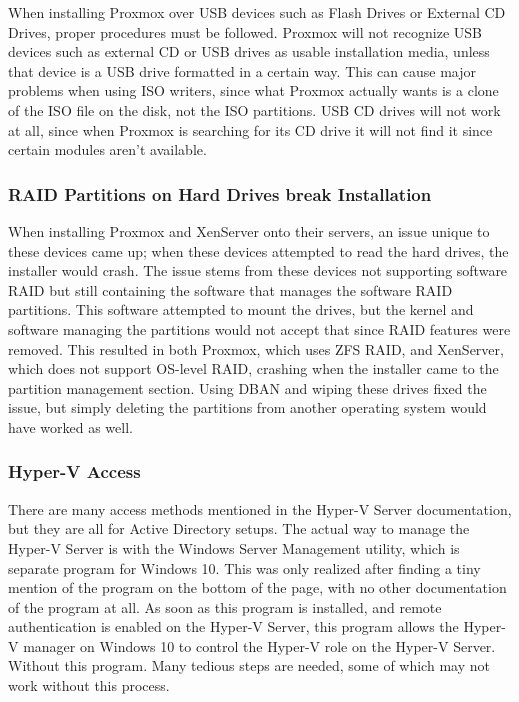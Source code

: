 \documentclass[12pt]{spieman}  %
\begin{document}
When installing Proxmox over USB devices such as Flash Drives or External CD Drives, proper procedures must be followed. Proxmox will not recognize USB devices such as external CD or USB drives as usable installation media, unless that device is a USB drive formatted in a certain way. This can cause major problems when using ISO writers, since what Proxmox actually wants is a clone of the ISO file on the disk, not the ISO partitions. USB CD drives will not work at all, since when Proxmox is searching for its CD drive it will not find it since certain modules aren't available.

\subsubsection{RAID Partitions on Hard Drives break Installation}

When installing Proxmox and XenServer onto their servers, an issue unique to these devices came up; when these devices attempted to read the hard drives, the installer would crash. The issue stems from these devices not supporting software RAID but still containing the software that manages the software RAID partitions. This software attempted to mount the drives, but the kernel and software managing the partitions would not accept that since RAID features were removed. This resulted in both Proxmox, which uses ZFS RAID, and XenServer, which does not support OS-level RAID, crashing when the installer came to the partition management section. Using DBAN and wiping these drives fixed the issue, but simply deleting the partitions from another operating system would have worked as well.

\subsubsection{Hyper-V Access}

There are many access methods mentioned in the Hyper-V Server documentation, but they are all for Active Directory setups.  The actual way to manage the Hyper-V Server is with the Windows Server Management utility, which is separate program for Windows 10. This was only realized after finding a tiny mention of the program on the bottom of the page, with no other documentation of the program at all. As soon as this program is installed, and remote authentication is enabled on the Hyper-V Server, this program allows the Hyper-V manager on Windows 10 to control the Hyper-V role on the Hyper-V Server. Without this program. Many tedious steps are needed, some of which may not work without this process.
\end{document}
